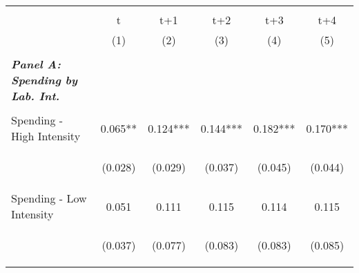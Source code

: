 
    \begin{tabular}{lccccc} \hline
    \vspace{-2pt} & \vspace{-2pt} & \vspace{-2pt} & \vspace{-2pt} & \vspace{-2pt} \\
     
     & t & t+1 & t+2 & t+3 & t+4 \\ 
    & (1) & (2) & (3) & (4) & (5) \\
   \vspace{-2pt} & \vspace{-2pt} & \vspace{-2pt} & \vspace{-2pt} \\
    \hline
   \multicolumn{1}{l}{\textit{\textbf{Panel A: Spending by Lab. Int.}}} \\ 
    
    \vspace{-2pt} & \vspace{-2pt} & \vspace{-2pt} & \vspace{-2pt} \\
    
    Spending - High Intensity & 0.065** & 0.124*** & 0.144*** & 0.182*** & 0.170*** \\
    & \begin{footnotesize}(0.028)\end{footnotesize} & \begin{footnotesize}(0.029)\end{footnotesize} & \begin{footnotesize}(0.037)\end{footnotesize} & \begin{footnotesize}(0.045)\end{footnotesize} & \begin{footnotesize}(0.044)\end{footnotesize} \\
    Spending - Low Intensity & 0.051 & 0.111 & 0.115 & 0.114 & 0.115 \\
    & \begin{footnotesize}(0.037)\end{footnotesize} & \begin{footnotesize}(0.077)\end{footnotesize} & \begin{footnotesize}(0.083)\end{footnotesize} & \begin{footnotesize}(0.083)\end{footnotesize} & \begin{footnotesize}(0.085)\end{footnotesize} \\
 

\end{tabular}
